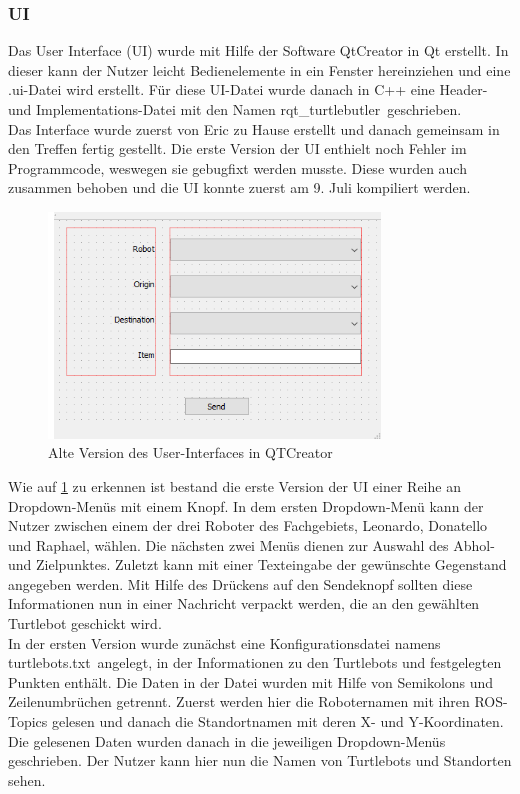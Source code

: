 \documentclass[a4paper,12pt,headsepline]{scrartcl}
\begin{document}
	\subsubsection{UI}
		Das User Interface (UI) wurde mit Hilfe der Software QtCreator in Qt erstellt. In dieser kann der Nutzer leicht Bedienelemente in ein Fenster hereinziehen und eine \glqq .ui\grqq-Datei wird erstellt. Für diese UI-Datei wurde danach in C++ eine Header- und Implementations-Datei mit den Namen \glqq rqt{\_}turtlebutler\grqq\ geschrieben.\\
		Das Interface wurde zuerst von Eric zu Hause erstellt und danach gemeinsam in den Treffen fertig gestellt. Die erste Version der UI enthielt noch Fehler im Programmcode, weswegen sie gebugfixt werden musste. Diese wurden auch zusammen behoben und die UI konnte zuerst am 9. Juli kompiliert werden.
		\begin{figure} [H]
			\centering
			\includegraphics[height=6cm]{Images/Turtlebutler_Old.png}
			\caption{Alte Version des User-Interfaces in QTCreator}
			\label{fig:OldUI}
		\end{figure}
		Wie auf \cref{fig:OldUI} zu erkennen ist bestand die erste Version der UI einer Reihe an Dropdown-Menüs mit einem Knopf. In dem ersten Dropdown-Menü kann der Nutzer zwischen einem der drei Roboter des Fachgebiets, Leonardo, Donatello und Raphael, wählen. Die nächsten zwei Menüs dienen zur Auswahl des Abhol- und Zielpunktes. Zuletzt kann mit einer Texteingabe der gewünschte Gegenstand angegeben werden. Mit Hilfe des Drückens auf den Sendeknopf sollten diese Informationen nun in einer Nachricht verpackt werden, die an den gewählten Turtlebot geschickt wird.\\
		In der ersten Version wurde zunächst eine Konfigurationsdatei namens \glqq turtlebots.txt\grqq\ angelegt, in der Informationen zu den Turtlebots und festgelegten Punkten enthält. Die Daten in der Datei wurden mit Hilfe von Semikolons und Zeilenumbrüchen getrennt. Zuerst werden hier die Roboternamen mit ihren ROS-Topics gelesen und danach die Standortnamen mit deren X- und Y-Koordinaten.  Die gelesenen Daten wurden danach in die jeweiligen Dropdown-Menüs geschrieben. Der Nutzer kann hier nun die Namen von Turtlebots und Standorten sehen.\\
\end{document}
